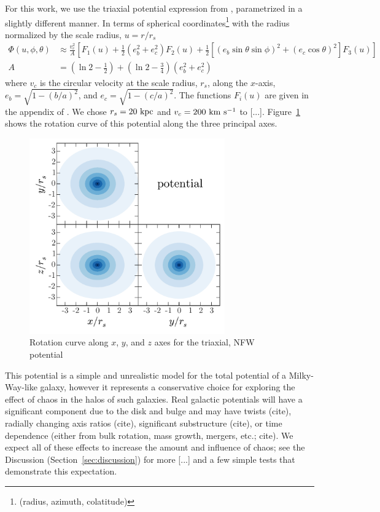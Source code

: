 \documentclass[letterpaper,12pt,preprint]{aastex}
\begin{document}
For this work, we use the triaxial potential expression from \citet{lee03}, parametrized in a slightly different manner. In terms of spherical coordinates\footnote{(radius, azimuth, colatitude)} with the radius normalized by the scale radius, $u = r/r_s$
\begin{align}
	\Phi(u,\phi,\theta) &\approx \frac{v_c^2}{A}\left[F_1(u) + \frac{1}{2}(e_b^2 + e_c^2)F_2(u) + \frac{1}{2} [(e_b\sin\theta \sin\phi)^2 + (e_c\cos\theta)^2] F_3(u) \right]\\
	A &= \left(\ln2 - \frac{1}{2}\right) + \left(\ln2-\frac{3}{4}\right) (e_b^2 + e_c^2)
\end{align}
where $v_c$ is the circular velocity at the scale radius, $r_s$, along the $x$-axis, $e_b = \sqrt{1 - (b/a)^2}$, and $e_c = \sqrt{1 - (c/a)^2}$. The functions $F_i(u)$ are given in the appendix of \cite{lee03}. We chose $r_s=20~{\rm kpc}$ and $v_c = 200~{\rm km}~{\rm s}^{-1}$ to [...]. Figure~\ref{fig:potential} shows the rotation curve of this potential along the three principal axes.

\begin{figure}[!h]
\begin{center}
\includegraphics[width=0.75\textwidth]{figures/potential.pdf}
\caption{Rotation curve along $x$, $y$, and $z$ axes for the triaxial, NFW potential } \label{fig:potential}
\end{center}
\end{figure}

This potential is a simple and unrealistic model for the total potential of a Milky-Way-like galaxy, however it represents a conservative choice for exploring the effect of chaos in the halos of such galaxies. Real galactic potentials will have a significant component due to the disk and bulge and may have twists (cite), radially changing axis ratios (cite), significant substructure (cite), or time dependence (either from bulk rotation, mass growth, mergers, etc.; cite). We expect all of these effects to increase the amount and influence of chaos; see the Discussion (Section~\ref{sec:discussion}) for more [...] and a few simple tests that demonstrate this expectation.
\end{document}
